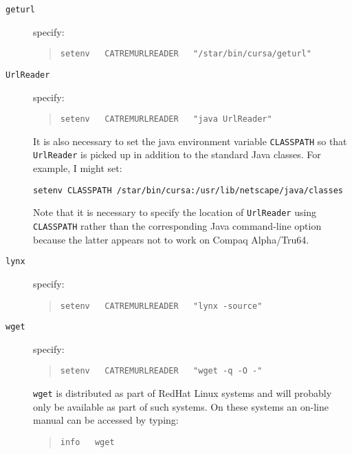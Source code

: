 \documentclass[twoside,11pt]{article}
\renewcommand{\_}{\texttt{\symbol{95}}}
\begin{document}
\begin{description}

  \item[{\tt geturl}] specify:

  \begin{quote}
   {\tt setenv ~ CATREM\_URLREADER ~ "/star/bin/cursa/geturl"}
  \end{quote}

  \item[{\tt UrlReader}] specify:

  \begin{quote}
   {\tt setenv ~ CATREM\_URLREADER ~ "java  UrlReader"}
  \end{quote}

   It is also necessary to set the java environment variable {\tt CLASSPATH}
   so that {\tt UrlReader} is picked up in addition to the standard Java
   classes.  For example, I might set:

  \begin{center}
   {\small \tt setenv~CLASSPATH~/star/bin/cursa:/usr/lib/netscape/java/classes}
  \end{center}

   Note that it is necessary to specify the location of {\tt UrlReader}
   using {\tt CLASSPATH} rather than the corresponding Java command-line
   option    because the latter appears not to work on Compaq Alpha/Tru64.

  \item[{\tt lynx}] specify:

  \begin{quote}
   {\tt setenv ~ CATREM\_URLREADER ~ "lynx -source"}
  \end{quote}

  \item[{\tt wget}] specify:

  \begin{quote}
   {\tt setenv ~ CATREM\_URLREADER ~ "wget -q -O -"}
  \end{quote}

   {\tt wget} is distributed as part of RedHat Linux systems and will
   probably only be available as part of such systems.  On these systems
   an on-line manual can be accessed by typing:

  \begin{quote}
   {\tt info ~ wget}
  \end{quote}

\end{description}
\end{document}
